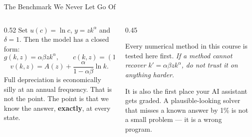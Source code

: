 \begin{frame}{The Benchmark We Never Let Go Of}
\begin{columns}[T]
\begin{column}{0.52\textwidth}
\small
Set $u(c)=\ln c$, $y=zk^{\alpha}$ and $\delta=1$. Then the model has a closed form:
\[
  g(k,z)=\alpha\beta z k^{\alpha}, \qquad c(k,z)=(1-\alpha\beta)zk^{\alpha},
\]
\[
  v(k,z)=A(z)+\frac{\alpha}{1-\alpha\beta}\ln k .
\]
Full depreciation is economically silly at an annual frequency. That is not the point. The point is that we know the answer, \textbf{exactly}, at every state.
\end{column}
\begin{column}{0.45\textwidth}
\begin{takeawaybox}[title=\textbf{The rule from 1.B1}]\small
Every numerical method in this course is tested here first. \emph{If a method cannot recover $k'=\alpha\beta z k^{\alpha}$, do not trust it on anything harder.}
\end{takeawaybox}
\medskip
\begin{examplebox}\footnotesize
It is also the first place your AI assistant gets graded. A plausible-looking solver that misses a known answer by 1\% is not a small problem --- it is a wrong program.
\end{examplebox}
\end{column}
\end{columns}
\vspace{1mm}
\end{frame}

